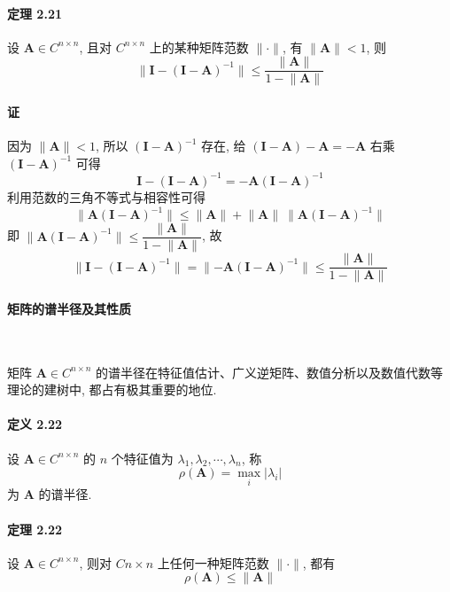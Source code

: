 \paragraph*{定理 2.21} 设 $\bm{A} \in C^{n\times n}$, 且对 $C^{n\times n}$ 上的某种矩阵范数 $\lVert \bm{\cdot} \rVert$, 有 $\lVert \bm{A} \rVert < 1$, 则
$$
    \lVert \bm{I} - (\bm{I} - \bm{A})^{-1} \rVert \leqslant \dfrac{\lVert \bm{A} \rVert}{1 - \lVert \bm{A} \rVert}
$$

\paragraph*{证} 因为 $\lVert \bm{A} \rVert < 1$, 所以 $(\bm{I} - \bm{A})^{-1}$ 存在, 给 $(\bm{I} - \bm{A}) - \bm{A} = -\bm{A}$ 右乘 $(\bm{I} - \bm{A})^{-1}$ 可得
$$
    \bm{I} - (\bm{I} - \bm{A})^{-1} = -\bm{A}(\bm{I} - \bm{A})^{-1}
$$
利用范数的三角不等式与相容性可得
$$
    \lVert \bm{A}(\bm{I} - \bm{A})^{-1} \rVert \leqslant \lVert \bm{A} \rVert + \lVert \bm{A} \rVert \ \lVert \bm{A}(\bm{I} - \bm{A})^{-1} \rVert
$$
即 $\lVert \bm{A}(\bm{I} - \bm{A})^{-1} \rVert \leqslant \dfrac{\lVert \bm{A} \rVert}{1 - \lVert \bm{A} \rVert}$, 故
$$
    \lVert \bm{I} - (\bm{I} - \bm{A})^{-1} \rVert = \lVert -\bm{A}(\bm{I} - \bm{A})^{-1} \rVert \leqslant \dfrac{\lVert \bm{A} \rVert}{1 - \lVert \bm{A} \rVert}
$$

\paragraph[]{矩阵的谱半径及其性质} \

\par 矩阵 $\bm{A} \in C^{n\times n}$ 的谱半径在特征值估计、广义逆矩阵、数值分析以及数值代数等理论的建树中, 都占有极其重要的地位.

\paragraph*{定义 2.22} 设 $\bm{A} \in C^{n\times n}$ 的 $n$ 个特征值为 $\lambda_1, \lambda_2, \cdots, \lambda_n$, 称
$$
    \rho(\bm{A}) = \mathop{\max}\limits_{i} \lvert \lambda_i \rvert
$$
为 $\bm{A}$ 的谱半径.

\paragraph*{定理 2.22} 设 $\bm{A} \in C^{n\times n}$, 则对 $C{n\times n}$ 上任何一种矩阵范数 $\lVert \bm{\cdot} \rVert$, 都有
$$
    \rho(\bm{A}) \leqslant \lVert \bm{A} \rVert
$$

